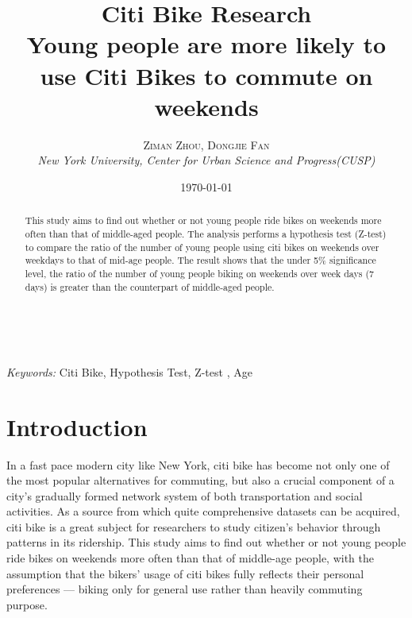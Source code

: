 \documentclass[a4paper, 11pt]{article} %
\title{\textbf{Citi Bike Research}\\ %
Young people are more likely to use Citi Bikes to commute on weekends} %
\author{\textsc{Ziman Zhou, Dongjie Fan} %
\\{\textit{New York University, Center for Urban Science and Progress(CUSP)}}} %
\date{\today} %
\makeatletter
\renewcommand{\maketitle}{ %
\begin{flushright} %
{\LARGE\@title} %

\vspace{50pt} %

{\large\@author} %
\\\@date %

\vspace{40pt} %
\end{flushright}
}
\makeatother
\begin{document}
\maketitle %



\begin{abstract}
This study aims to find out whether or not young people ride bikes on weekends more often than that of middle-aged people. The analysis performs a hypothesis test (Z-test) to compare the ratio of the number of young people using citi bikes on weekends over weekdays to that of mid-age people. The result shows that the under 5\% significance level, the ratio of the number of young people biking on weekends over week days (7 days) is greater than the counterpart of middle-aged people.
\end{abstract}

\hspace*{3,6mm}\textit{Keywords:} Citi Bike, Hypothesis Test, Z-test , Age %

\vspace{30pt} %


\section*{Introduction}

In a fast pace modern city like New York, citi bike has become not only one of the most popular alternatives for commuting, but also a crucial component of a city's gradually formed network system of both transportation and social activities. As a source from which quite comprehensive datasets can be acquired, citi bike is a great subject for researchers to study citizen's behavior through patterns in its ridership. This study aims to find out whether or not young people ride bikes on weekends more often than that of middle-age people, with the assumption that the bikers' usage of citi bikes fully reflects their personal preferences --- biking only for general use rather than heavily commuting purpose. 
\end{document}
